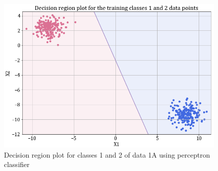 \documentclass[11pt,a4paper]{article}
\begin{document}
\begin{figure}[H]
    \centering
    \includegraphics[scale=0.45]{images/1A_perceptron_training_classes_1_and_2_dec_reg.png}
    \caption{Decision region plot for classes 1 and 2 of data 1A using perceptron classifier}
    \label{fig:perc_dec_reg_12}
\end{figure}
\end{document}
